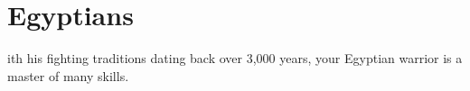 
\clearpage

\section{\textsf{Egyptians}}


ith his fighting traditions dating back over 3,000 years, your Egyptian warrior is a master of many skills.

